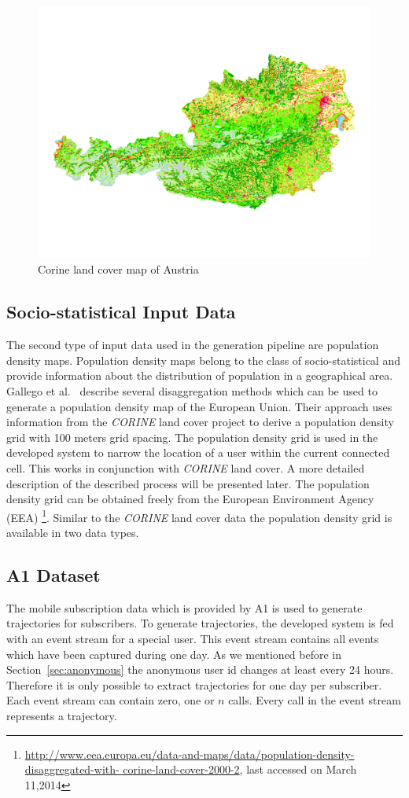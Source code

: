 \documentclass[master,english]{hgbthesis}
\begin{document}
\begin{figure}
	\centering
	\includegraphics[width=\linewidth]{./images/clc_austria.png}
	\caption{Corine land cover map of Austria}
	\label{fig:clc_austria}
\end{figure}
\subsection{Socio-statistical Input Data}
The second type of input data used in the generation pipeline are population density maps. Population density maps belong to the class of socio-statistical and provide information about the distribution of population in a geographical area. Gallego et al.\ \cite{Gallego2010,Gallego2011} describe several disaggregation methods which can be used to generate a population density map of the European Union.
Their approach uses information from the \emph{CORINE} land cover project to derive a population density grid with 100 meters grid spacing. The population density grid is used in the developed system to narrow the location of a user within the current connected cell. This works in conjunction with \emph{CORINE} land cover. A more detailed description of the described process will be presented later.
The population density grid can be obtained freely from the European Environment Agency (EEA) \footnote{\url{http://www.eea.europa.eu/data-and-maps/data/population-density-disaggregated-with-
	corine-land-cover-2000-2}, last accessed on March 11,2014}. Similar to the \emph{CORINE} land cover data the population density grid is available in two data types.
\subsection{A1 Dataset}
The mobile subscription data which is provided by A1 is used to generate trajectories for subscribers. To generate trajectories, the developed system is fed with an event stream for a special user. This event stream contains all events which have been captured during one day. As we mentioned before in Section~\ref{sec:anonymous} the anonymous user id changes at least every 24 hours. Therefore it is only possible to extract trajectories for one day per subscriber. Each event stream can contain zero, one or $n$ calls. Every call in the event stream represents a trajectory.
\end{document}
